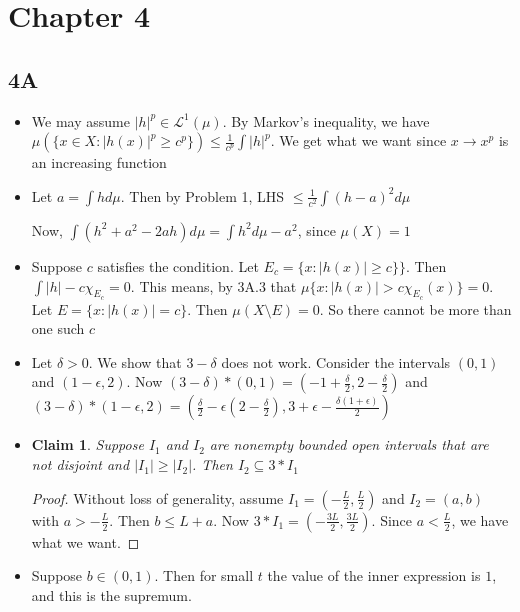 \documentclass{article}
\newtheorem*{claim}{Claim}
\begin{document}
\section*{Chapter 4}
\subsection*{4A}
\begin{itemize}
    \item [1] We may assume $|h|^p \in \mathcal{L}^1(\mu)$. By Markov's inequality, we have $\mu(\{x \in X: |h(x)|^p\geq c^p\})\leq \frac{1}{c^p}\int|h|^p$. We get what we want since $x \to x^p$ is an increasing function
    \item [2] Let $a=\int hd\mu$. Then by Problem 1, LHS $\leq \frac{1}{c^2}\int(h-a)^2d\mu$ 
    
    Now, $\int (h^2+a^2-2ah)d\mu=\int h^2d\mu-a^2$, since $\mu(X)=1$ 

    \item [3] Suppose $c$ satisfies the condition. Let $E_c=\{x:|h(x)|\geq c\}\}$. Then $\int |h|-c\chi_{E_c}=0$. This means, by 3A.3 that $\mu\{x:|h(x)|>c\chi_{E_c}(x)\}=0$. Let $E=\{x:|h(x)|=c\}$. Then $\mu(X \setminus E)=0$. So there cannot be more than one such $c$

    \item[4] Let $\delta>0$. We show that $3-\delta$ does not work. Consider the intervals $(0,1)$ and $(1-\epsilon,2)$. Now $(3-\delta)*(0,1)=(-1+\frac{\delta}{2},2-\frac{\delta}{2})$ and $(3-\delta)*(1-\epsilon,2)=(\frac{\delta}{2}-\epsilon(2-\frac{\delta}{2}),3+\epsilon-\frac{\delta(1+\epsilon)}{2})$

    \item [5]\begin{claim}
        Suppose $I_1$ and $I_2$ are nonempty bounded open intervals that are not disjoint and $|I_1|\geq |I_2|$. Then $I_2 \subseteq 3*I_1$
    \end{claim}

    \begin{proof}
        Without loss of generality, assume $I_1=(-\frac{L}{2},\frac{L}{2})$ and $I_2=(a,b)$ with $a>-\frac{L}{2}$. Then $b \leq L +a$. Now $3*I_1=(-\frac{3L}{2},\frac{3L}{2})$. Since $a<\frac{L}{2}$, we have what we want.
    \end{proof}

    \item[6] 
    Suppose $b \in (0,1)$. Then for small $t$ the value of the inner expression is $1$, and this is the supremum.


\end{itemize}
\end{document}

